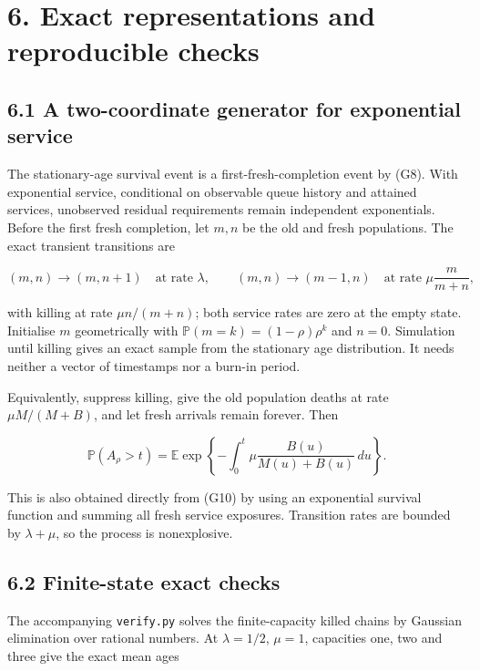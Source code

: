 \documentclass[
  11pt,
  a4paper,
]{scrartcl}
\newcounter{none} %
\begin{document}
\section{6. Exact representations and reproducible
checks}\label{exact-representations-and-reproducible-checks}

\subsection{6.1 A two-coordinate generator for exponential
service}\label{a-two-coordinate-generator-for-exponential-service}

The stationary-age survival event is a first-fresh-completion event by
(G8). With exponential service, conditional on observable queue history
and attained services, unobserved residual requirements remain
independent exponentials. Before the first fresh completion, let \(m,n\)
be the old and fresh populations. The exact transient transitions are

\[
(m,n)\longrightarrow(m,n+1)\quad\text{at rate }\lambda,
\qquad
(m,n)\longrightarrow(m-1,n)\quad\text{at rate }\mu\frac{m}{m+n},
\]

with killing at rate \(\mu n/(m+n)\); both service rates are zero at the
empty state. Initialise \(m\) geometrically with
\(\mathbb P(m=k)=(1-\rho)\rho^k\) and \(n=0\). Simulation until killing
gives an exact sample from the stationary age distribution. It needs
neither a vector of timestamps nor a burn-in period.

Equivalently, suppress killing, give the old population deaths at rate
\(\mu M/(M+B)\), and let fresh arrivals remain forever. Then

\[
\mathbb P(A_\rho>t)=\mathbb E\exp\left\{-\int_0^t\mu\frac{B(u)}{M(u)+B(u)}\,du\right\}.
\tag{V1}
\]

This is also obtained directly from (G10) by using an exponential
survival function and summing all fresh service exposures. Transition
rates are bounded by \(\lambda+\mu\), so the process is nonexplosive.

\subsection{6.2 Finite-state exact
checks}\label{finite-state-exact-checks}

The accompanying \texttt{verify.py} solves the finite-capacity killed
chains by Gaussian elimination over rational numbers. At
\(\lambda=1/2\), \(\mu=1\), capacities one, two and three give the exact
mean ages
\end{document}
